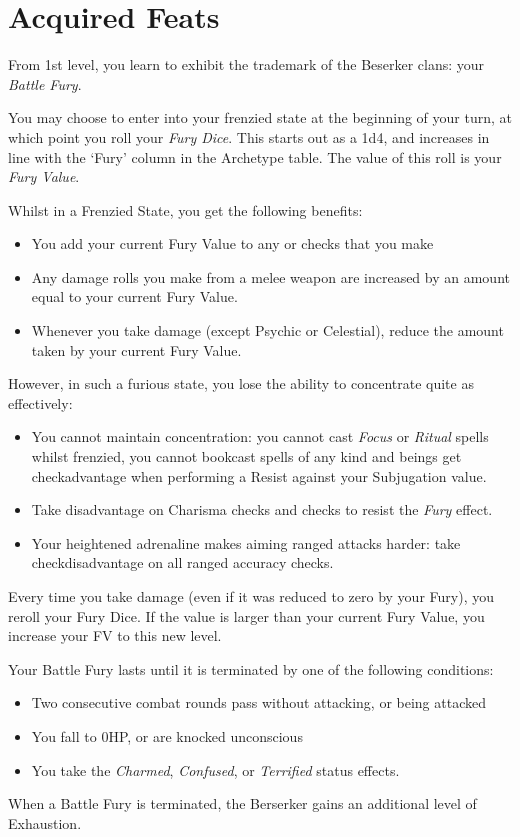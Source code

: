 \section*{Acquired Feats}

{
From 1st level, you learn to exhibit the trademark of the Beserker clans: your {\it Battle Fury}. 

You may choose to enter into your frenzied state at the beginning of your turn, at which point you roll your {\it Fury Dice}. This starts out as a 1d4, and increases in line with the `Fury' column in the Archetype table. The value of this roll is your {\it Fury Value}.


Whilst in a Frenzied State, you get the following benefits:

\begin{itemize}
	\item You add your current Fury Value to any \attPhys{} or \attSpr{} checks that you make
	\item Any damage rolls you make from a melee weapon are increased by an amount equal to your current Fury Value. 
	\item Whenever you take damage (except Psychic or Celestial), reduce the amount taken by your current Fury Value. 
\end{itemize} 

However, in such a furious state, you lose the ability to concentrate quite as effectively:
\begin{itemize}
	\item You cannot maintain concentration: you cannot cast {\it Focus} or {\it Ritual} spells whilst frenzied, you cannot book\minus{}cast spells of any kind and beings get check\minus{}advantage when performing a Resist against your Subjugation value.  
	\item Take disadvantage on Charisma checks and checks to resist the {\it Fury} effect. 
	\item Your heightened adrenaline makes aiming ranged attacks harder: take check\minus{}disadvantage on all ranged accuracy checks.
\end{itemize}


Every time you take damage (even if it was reduced to zero by your Fury), you re\minus{}roll your Fury Dice. If the value is larger than your current Fury Value, you increase your FV to this new level.

Your Battle Fury lasts until it is terminated by one of the following conditions:
\begin{itemize}
	\item Two consecutive combat rounds pass without attacking, or being attacked
	\item You fall to 0HP, or are knocked unconscious
	\item You take the {\it Charmed}, {\it Confused}, or {\it Terrified} status effects. 
\end{itemize}

When a Battle Fury is terminated, the Berserker gains an additional level of Exhaustion. 

}

